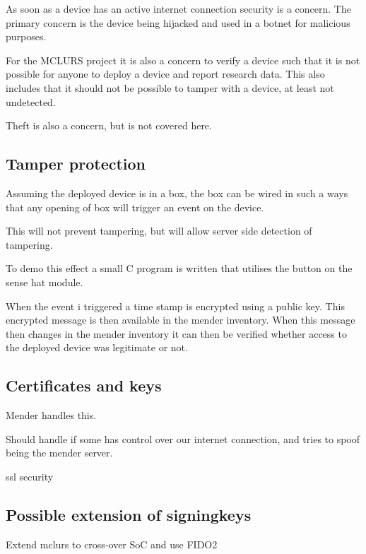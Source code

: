 \documentclass[../../main.tex]{subfiles}
\begin{document}
As soon as a device has an active internet connection security is a concern.
The primary concern is the device being hijacked and used in a botnet for malicious 
purposes.

For the MCLURS project it is also a concern to verify a device such that it is not possible for
anyone to deploy a device and report research data. This also includes that it should not be possible
to tamper with a device, at least not undetected.



Theft is also a concern, but is not covered here.



%
%
%


\subsection{Tamper protection}%
\label{sub:tamper_protection}

Assuming the deployed device is in a box, the box can be wired in such a ways that any opening of
box will trigger an event on the device.

This will not prevent tampering, but will allow server side detection of tampering.

To demo this effect a small C program is written that utilises the button on the sense hat
module.

When the event i triggered a time stamp is encrypted using a public key.
This encrypted message is then available in the mender inventory.
When this message then changes in the mender inventory it can then be verified
whether access to the deployed device was legitimate or not.


\subsection{Certificates and keys}%
\label{sub:certificates_and_keys}

Mender handles this.

Should handle if some has control over our internet connection, and tries to spoof being the
mender server.

ssl security


\subsection{Possible extension of signingkeys}%
\label{ssub:possible_extension_of_signingkey}

Extend mclurs to cross-over SoC and use FIDO2



	
\end{document}

